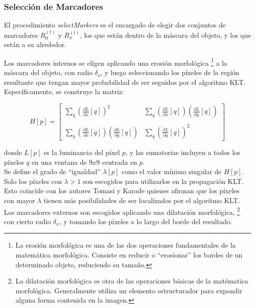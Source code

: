 \documentclass[a4paper,10pt]{article}
\begin{document}
\subsubsection{Selección de Marcadores}
El procedimiento \textit{selectMarkers} es el encargado de elegir dos conjuntos 
de marcadores $R_{0}^{(t)}$ y $R_{x}^{(t)}$, los que están dentro de la máscara del objeto, y los que están a
su alrededor.

Los marcadores internos se eligen aplicando una erosión morfológica 
\footnote{La erosión morfológica es una de las dos operaciones fundamentales de la matemática morfológica. Consiste
en reducir o ``erosionar'' los bordes de un determinado objeto, reduciendo su tamaño. }
 a la máscara del objeto, con radio $\delta_{o}$, y 
luego seleccionando los píxeles de la región resultante que tengan mayor probabilidad
de ser seguidos por el algoritmo KLT. Específicamente, se construye la matriz:

\begin{equation}
    H[p] = \left[\begin{array}{cc}
                \sum_{q}(\frac{\partial L}{\partial x}[q])^2 & \sum_{q}(\frac{\partial L}{\partial x}[q])(\frac{\partial L}{\partial y}[q]) \\
                & \\
                \sum_{q}(\frac{\partial L}{\partial x}[q])(\frac{\partial L}{\partial y}[q]) & \sum_{q}(\frac{\partial L}{\partial y}[q])^2 \end{array}\right]
    \label{IFTrace-matrix-H}
\end{equation}


donde $L[p]$ es la luminancia del píxel $p$, y las sumatorias incluyen a todos los
píxeles $q$ en una ventana de $9x9$ centrada en $p$.\\
Se define el grado de ``igualdad'' $\lambda[p]$ como el valor mínimo singular de $H[p]$. 
Solo los píxeles con $\lambda > 1$ son escogidos para utilizarlos en la 
propagación KLT. Esto coincide con los autores Tomasi y Karade \cite{Tomasi91detectionand}
quienes afirman que los píxeles con mayor $\lambda$ tienen más posibilidades
de ser localizados por el algoritmo KLT.\\
Los marcadores externos son escogidos aplicando una dilatación morfológica,
\footnote{La dilatación morfológica es otra de las operaciones  básicas de la matématica morfológica. Generalmente utiliza un elemento 
estructurador para expandir alguna forma contenida en la imagen.}
 con cierto radio $\delta_{x}$, y tomando los píxeles a lo largo del borde del resultado.
\end{document}
